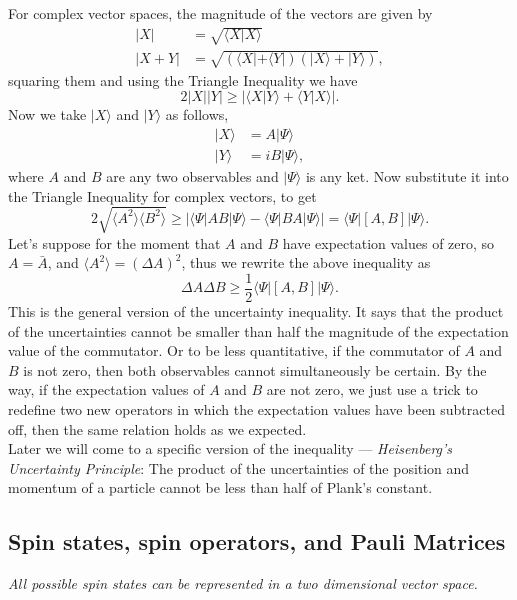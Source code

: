 \documentclass{article}
\newcommand{\be}{\begin{equation}}
\newcommand{\ee}{\end{equation}}
\newcommand{\bs}{\be\begin{split}}
\newcommand{\1}{\left}
\newcommand{\2}{\right}
\newcommand{\la}{\langle}
\newcommand{\ra}{\rangle}
\newcommand{\Del}{\Delta}
\begin{document}
For complex vector spaces, the magnitude of the vectors are given by
\bs
|X|&=\sqrt{\la X|X\ra}\\
|X+Y|&=\sqrt{(\la X|+\la Y|)(|X\ra+|Y\ra)},
\end{split}\ee
squaring them and using the Triangle Inequality we have
\be
2|X||Y|\geqslant |\la X|Y\ra+\la Y|X\ra|.
\ee
Now we take $|X\ra$ and $|Y\ra$ as follows,
\bs
|X\ra&=A|\Psi\ra\\
|Y\ra&=iB|\Psi\ra,
\end{split}\ee
where $A$ and $B$ are any two observables and $|\Psi\ra$ is any ket. Now substitute it into the Triangle Inequality for complex vectors, to get
\be
2\sqrt{\la A^2\ra\la B^2\ra} \geqslant |\la \Psi|AB|\Psi\ra-\la \Psi|BA|\Psi\ra|=\la \Psi|[A,B]|\Psi\ra.
\ee
Let's suppose for the moment that $A$ and $B$ have expectation values of zero, so $A=\bar A$, and $\la A^2\ra=(\Del A)^2$, thus we rewrite the above inequality as 
\be
\Del A\Del B\geqslant \frac 1 2\la \Psi|[A,B]|\Psi\ra.
\ee
This is the general version of the uncertainty inequality. It says that the product of the uncertainties cannot be smaller than half the magnitude of the expectation value of the commutator. Or to be less quantitative, if the commutator of $A$ and $B$ is not zero, then both observables cannot simultaneously be certain. By the way, if the expectation values of $A$ and $B$ are not zero, we just use a trick to redefine two new operators in which the expectation values have been subtracted off, then the same relation holds as we expected.\\

Later we will come to a specific version of the inequality --- \textit{Heisenberg's Uncertainty Principle}: The product of the uncertainties of the position and momentum of a particle cannot be less than half of Plank's constant.


\subsection{Spin states, spin operators, and Pauli Matrices}
\textit{All possible spin states can be represented in a two dimensional vector space.}
\end{document}
